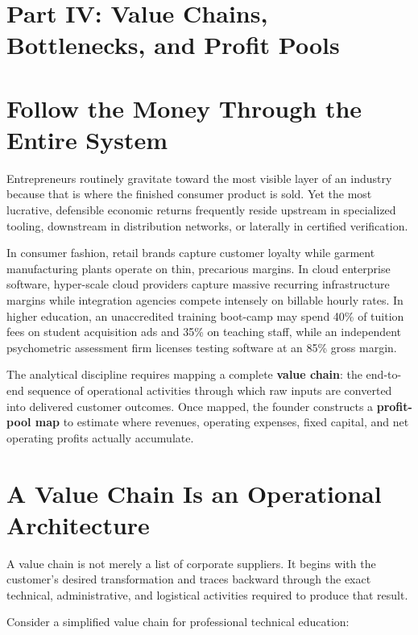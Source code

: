\section*{Part IV: Value Chains, Bottlenecks, and Profit Pools}

\section{Follow the Money Through the Entire System}

Entrepreneurs routinely gravitate toward the most visible layer of an industry because that is where the finished consumer product is sold. Yet the most lucrative, defensible economic returns frequently reside upstream in specialized tooling, downstream in distribution networks, or laterally in certified verification.

In consumer fashion, retail brands capture customer loyalty while garment manufacturing plants operate on thin, precarious margins. In cloud enterprise software, hyper-scale cloud providers capture massive recurring infrastructure margins while integration agencies compete intensely on billable hourly rates. In higher education, an unaccredited training boot-camp may spend 40\% of tuition fees on student acquisition ads and 35\% on teaching staff, while an independent psychometric assessment firm licenses testing software at an 85\% gross margin.

The analytical discipline requires mapping a complete \textbf{value chain}: the end-to-end sequence of operational activities through which raw inputs are converted into delivered customer outcomes. Once mapped, the founder constructs a \textbf{profit-pool map} to estimate where revenues, operating expenses, fixed capital, and net operating profits actually accumulate.

\section{A Value Chain Is an Operational Architecture}

A value chain is not merely a list of corporate suppliers. It begins with the customer's desired transformation and traces backward through the exact technical, administrative, and logistical activities required to produce that result.

Consider a simplified value chain for professional technical education:

